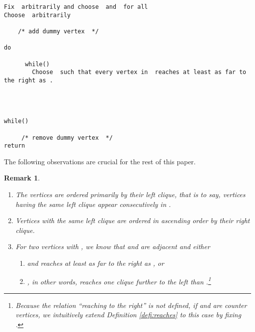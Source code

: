 \documentclass[10pt]{article}
\newtheorem{remark}[theorem]{Remark}
\newcommand{\q}[1]{``#1''}\newcommand{\fu}[1]{\mathcal{#1}}\newcommand{\mc}[1]{\mathsf{#1}}\newcommand{\ri}[1]{\mathscr{#1}}\newcommand{\co}[1]{\fu{C}({#1})}\newcommand{\lc}[1]{\alpha(#1)}\newcommand{\rc}[1]{\beta(#1)}\newcommand{\ema}[1]{\mathcal{#1}}\newcommand{\fe}[2]{\fu{F}(#1,#2)}\newcommand{\lv}[1]{l_{#1}}\newcommand{\rv}[1]{r_{#1}}\newcommand{\mv}[1]{m_{#1}}\newcommand{\lvv}{\lv{v}}
\begin{document}
\begin{lstlisting}[caption={Definition of a cyclic order  on  that serves as the given vertex order.},captionpos=b,label=pseudoLabeling]
Fix  arbitrarily and choose  and  for all 
Choose  arbitrarily

    /* add dummy vertex  */

do
      
      while()
	    Choose  such that every vertex in  reaches at least as far to the right as .
	    
	    
	    
      
while() 

     /* remove dummy vertex  */
return 
\end{lstlisting}























The following observations are crucial for the rest of this paper.




\begin{remark}
\begin{enumerate}
\item\label{item:leftconsecutiv}
The vertices  are ordered primarily by their left clique, that is to say, vertices having 
the same left clique appear consecutively in .

\item 
Vertices with the same left clique are ordered in ascending 
order by their right clique.

\item\label{item:onemoreleft}
For two vertices  with , we know that  and  are adjacent and either
\begin{enumerate}

\item
 and  reaches at least as far to the right as , or

\item
, in other words,  reaches one clique further to the 
left than .\footnote{Because the relation \q{reaching to the right} is not defined, if  and  are counter vertices, we intuitively extend Definition \ref{defi:reaches} to this case by fixing .}

\end{enumerate}
\end{enumerate}
\end{remark}
\end{document}
